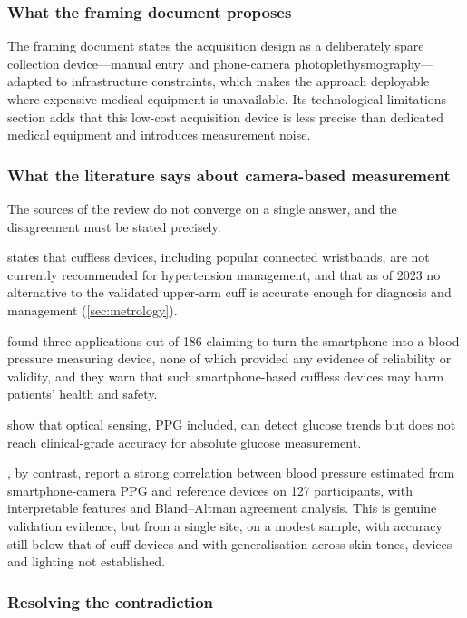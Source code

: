 \documentclass[12pt,a4paper,oneside]{report}
\begin{document}
\subsubsection{What the framing document proposes}

The framing document states the acquisition design as a deliberately spare collection device---manual entry and phone-camera photoplethysmography---adapted to infrastructure constraints, which makes the approach deployable where expensive medical equipment is unavailable. Its technological limitations section adds that this low-cost acquisition device is less precise than dedicated medical equipment and introduces measurement noise.

\subsubsection{What the literature says about camera-based measurement}

The sources of the review do not converge on a single answer, and the disagreement must be stated precisely.

\Textcite{who2023hypertension} states that cuffless devices, including popular connected wristbands, are not currently recommended for hypertension management, and that as of 2023 no alternative to the validated upper-arm cuff is accurate enough for diagnosis and management (\cref{sec:metrology}).

\Textcite{alessa2019} found three applications out of 186 claiming to turn the smartphone into a blood pressure measuring device, none of which provided any evidence of reliability or validity, and they warn that such smartphone-based cuffless devices may harm patients' health and safety.

\Textcite{alhaddad2022} show that optical sensing, PPG included, can detect glucose trends but does not reach clinical-grade accuracy for absolute glucose measurement.

\Textcite{liu2025ppg}, by contrast, report a strong correlation between blood pressure estimated from smartphone-camera PPG and reference devices on 127 participants, with interpretable features and Bland--Altman agreement analysis. This is genuine validation evidence, but from a single site, on a modest sample, with accuracy still below that of cuff devices and with generalisation across skin tones, devices and lighting not established.


\subsubsection{Resolving the contradiction}\label{sec:contradiction}
\end{document}

